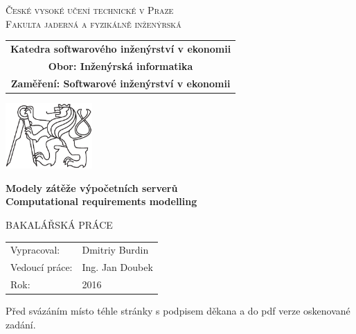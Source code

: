 \documentclass[a4paper,12pt,twoside]{scrreprt}
\newcommand{\cvut}{České vysoké učení technické v Praze}
\newcommand{\fjfi}{Fakulta jaderná a fyzikálně inženýrská}
\newcommand{\kse}{Katedra softwarového inženýrství v ekonomii}
\newcommand{\obor}{Inženýrská informatika}
\newcommand{\zamereni}{Softwarové inženýrství v ekonomii}
\newcommand{\nazevcz}{Modely zátěže výpočetních serverů}        %
\newcommand{\nazeven}{Computational requirements modelling}     %
\newcommand{\autor}{Dmitriy Burdin}           %
\newcommand{\rok}{2016}          %
\newcommand{\vedouci}{Ing. Jan Doubek}         %
\newcommand{\druh}{BAKALÁŘSKÁ PRÁCE}
\begin{document}
\thispagestyle{empty}

\begin{center}
    {\Large \textsc{\cvut}\\[1.5ex] \textsc{\fjfi}}\\
    \vspace{10mm}

    \begin{tabular}{c}
	    {\bf \kse}\\   
      {\bf Obor: \obor}\\
      {\bf Zaměření: \zamereni}\\
    \end{tabular}

   \vspace{10mm} \includegraphics[height=25mm]{lev.pdf} \vspace{15mm}

   {\huge \bf \nazevcz}\\
   \vspace{5mm}   
   {\huge \bf \nazeven}
   
   \vspace{15mm}
   {\Large \druh}

   \vfill
   {\large
    \begin{tabular}{ll}
    Vypracoval: & \autor\\
    Vedoucí práce: & \vedouci\\
    Rok: & \rok
    \end{tabular}
   }
\end{center}

\newpage  %
\thispagestyle{empty} %

Před svázáním místo téhle stránky  s podpisem
děkana a do pdf verze oskenované zadání.
\end{document}
